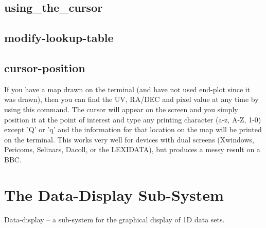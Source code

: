 \subsection{using_the_cursor}

\subsection{modify-lookup-table}

\subsection{cursor-position}

If you have a map drawn on the terminal (and have not used
end-plot since it was drawn), then you can find the UV, RA/DEC
and pixel value at any time by using this command. The cursor
will appear on the screen and you simply position it at the
point of interest and type any printing character (a-z, A-Z,
1-0) except 'Q' or 'q' and the information for that location
on the map will be printed on the terminal. This works very
well for devices with dual screens (Xwindows, Pericoms, Selinars,
Dacoll, or the LEXIDATA), but produces a messy result on a
BBC.





\section{The Data-Display Sub-System}

Data-display -- a sub-system for the graphical display of 1D data sets.

